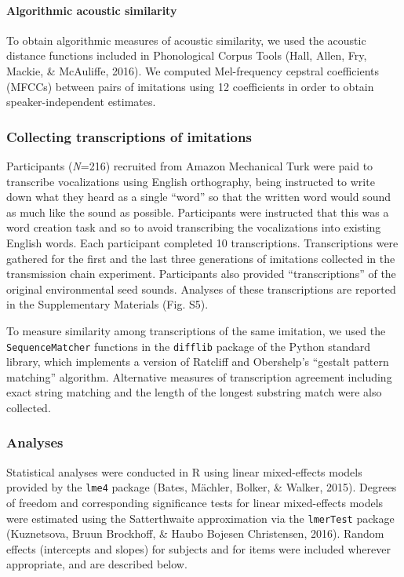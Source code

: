 \documentclass[english,floatsintext,man]{apa6}
\theoremstyle{definition}
\theoremstyle{definition}
\theoremstyle{remark}
\begin{document}
\paragraph{Algorithmic acoustic
similarity}\label{algorithmic-acoustic-similarity}

To obtain algorithmic measures of acoustic similarity, we used the
acoustic distance functions included in Phonological Corpus Tools (Hall,
Allen, Fry, Mackie, \& McAuliffe, 2016). We computed Mel-frequency
cepstral coefficients (MFCCs) between pairs of imitations using 12
coefficients in order to obtain speaker-independent estimates.

\subsubsection{Collecting transcriptions of
imitations}\label{collecting-transcriptions-of-imitations}

Participants (\emph{N}=216) recruited from Amazon Mechanical Turk were
paid to transcribe vocalizations using English orthography, being
instructed to write down what they heard as a single \enquote{word} so
that the written word would sound as much like the sound as possible.
Participants were instructed that this was a word creation task and so
to avoid transcribing the vocalizations into existing English words.
Each participant completed 10 transcriptions. Transcriptions were
gathered for the first and the last three generations of imitations
collected in the transmission chain experiment. Participants also
provided \enquote{transcriptions} of the original environmental seed
sounds. Analyses of these transcriptions are reported in the
Supplementary Materials (Fig. S5).

To measure similarity among transcriptions of the same imitation, we
used the \texttt{SequenceMatcher} functions in the \texttt{difflib}
package of the Python standard library, which implements a version of
Ratcliff and Obershelp's \enquote{gestalt pattern matching} algorithm.
Alternative measures of transcription agreement including exact string
matching and the length of the longest substring match were also
collected.

\subsubsection{Analyses}\label{analyses}

Statistical analyses were conducted in R using linear mixed-effects
models provided by the \texttt{lme4} package (Bates, Mächler, Bolker, \&
Walker, 2015). Degrees of freedom and corresponding significance tests
for linear mixed-effects models were estimated using the Satterthwaite
approximation via the \texttt{lmerTest} package (Kuznetsova, Bruun
Brockhoff, \& Haubo Bojesen Christensen, 2016). Random effects
(intercepts and slopes) for subjects and for items were included
wherever appropriate, and are described below.
\end{document}
